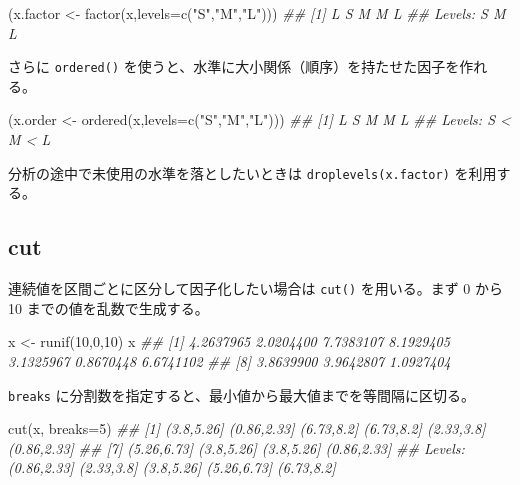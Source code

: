 \documentclass[
  letterpaper,
  xelatex,
  ja=standard, xelatex]{bxjsbook}
\newenvironment{Shaded}{\begin{snugshade}}{\end{snugshade}}
\newcommand{\AttributeTok}[1]{\textcolor[rgb]{0.40,0.45,0.13}{#1}}
\newcommand{\DecValTok}[1]{\textcolor[rgb]{0.68,0.00,0.00}{#1}}
\newcommand{\DocumentationTok}[1]{\textcolor[rgb]{0.37,0.37,0.37}{\textit{#1}}}
\newcommand{\FunctionTok}[1]{\textcolor[rgb]{0.28,0.35,0.67}{#1}}
\newcommand{\NormalTok}[1]{\textcolor[rgb]{0.00,0.23,0.31}{#1}}
\newcommand{\OtherTok}[1]{\textcolor[rgb]{0.00,0.23,0.31}{#1}}
\newcommand{\StringTok}[1]{\textcolor[rgb]{0.13,0.47,0.30}{#1}}
\begin{document}
\begin{Shaded}
\begin{Highlighting}[]
\NormalTok{(x.factor }\OtherTok{\textless{}{-}} \FunctionTok{factor}\NormalTok{(x,}\AttributeTok{levels=}\FunctionTok{c}\NormalTok{(}\StringTok{"S"}\NormalTok{,}\StringTok{"M"}\NormalTok{,}\StringTok{"L"}\NormalTok{)))}
\DocumentationTok{\#\# [1] L S M M L}
\DocumentationTok{\#\# Levels: S M L}
\end{Highlighting}
\end{Shaded}

さらに \texttt{ordered()}
を使うと、水準に大小関係（順序）を持たせた因子を作れる。

\begin{Shaded}
\begin{Highlighting}[]
\NormalTok{(x.order }\OtherTok{\textless{}{-}} \FunctionTok{ordered}\NormalTok{(x,}\AttributeTok{levels=}\FunctionTok{c}\NormalTok{(}\StringTok{"S"}\NormalTok{,}\StringTok{"M"}\NormalTok{,}\StringTok{"L"}\NormalTok{)))}
\DocumentationTok{\#\# [1] L S M M L}
\DocumentationTok{\#\# Levels: S \textless{} M \textless{} L}
\end{Highlighting}
\end{Shaded}

分析の途中で未使用の水準を落としたいときは \texttt{droplevels(x.factor)}
を利用する。

\subsection{cut}\label{cut}

連続値を区間ごとに区分して因子化したい場合は \texttt{cut()}
を用いる。まず 0 から 10 までの値を乱数で生成する。

\begin{Shaded}
\begin{Highlighting}[]
\NormalTok{x }\OtherTok{\textless{}{-}} \FunctionTok{runif}\NormalTok{(}\DecValTok{10}\NormalTok{,}\DecValTok{0}\NormalTok{,}\DecValTok{10}\NormalTok{)}
\NormalTok{x}
\DocumentationTok{\#\#  [1] 4.2637965 2.0204400 7.7383107 8.1929405 3.1325967 0.8670448 6.6741102}
\DocumentationTok{\#\#  [8] 3.8639900 3.9642807 1.0927404}
\end{Highlighting}
\end{Shaded}

\texttt{breaks}
に分割数を指定すると、最小値から最大値までを等間隔に区切る。

\begin{Shaded}
\begin{Highlighting}[]
\FunctionTok{cut}\NormalTok{(x, }\AttributeTok{breaks=}\DecValTok{5}\NormalTok{)}
\DocumentationTok{\#\#  [1] (3.8,5.26]  (0.86,2.33] (6.73,8.2]  (6.73,8.2]  (2.33,3.8]  (0.86,2.33]}
\DocumentationTok{\#\#  [7] (5.26,6.73] (3.8,5.26]  (3.8,5.26]  (0.86,2.33]}
\DocumentationTok{\#\# Levels: (0.86,2.33] (2.33,3.8] (3.8,5.26] (5.26,6.73] (6.73,8.2]}
\end{Highlighting}
\end{Shaded}
\end{document}
